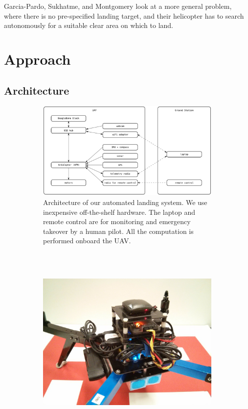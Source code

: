 \documentclass[10pt]{scrartcl} %
\begin{document}
Garcia-Pardo, Sukhatme, and Montgomery \cite{garcia_pardo_et_al_2002} look at a
more general problem, where there is no pre-specified landing target, and their
helicopter has to search autonomously for a suitable clear area on which to
land.


\section{Approach}

\subsection{Architecture}

\begin{figure}[h!]
    \centering
    \begin{subfigure}[b]{0.9\textwidth}
        \includegraphics[width=\textwidth]{images/architecture.png}
        \caption{
            Architecture of our automated landing system. We use inexpensive
            off-the-shelf hardware. The laptop and remote control are for
            monitoring and emergency takeover by a human pilot. All the
            computation is performed onboard the UAV.
        }
    \end{subfigure}
    \\~\\
    \begin{subfigure}[b]{0.9\textwidth}
        \includegraphics[width=\textwidth]{images/hardware.jpg}

\end{subfigure}
\end{figure}
\end{document}
